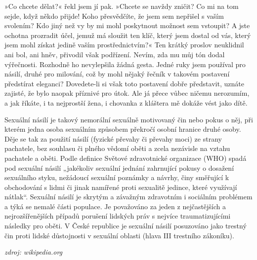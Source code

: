 \documentclass[13pt, a4paper, twoside]{article}
\begin{document}
»Co chcete dělat?« řekl jsem jí pak. »Chcete se navždy zničit? Co mi na tom sejde, když někdo přijde! Koho přesvědčíte, že jsem sem nepřišel s vaším svolením? Kdo jiný než vy by mi mohl poskytnout možnost sem vstoupit? A jste ochotna prozradit účel, jemuž má sloužit ten klíč, který jsem dostal od vás, který jsem mohl získat jedině vaším prostřednictvím?« Ten krátký proslov neuklidnil ani bol, ani hněv, přivodil však podřízení. Nevím, zda mu můj tón dodal výřečnosti. Rozhodně ho nevylepšila žádná gesta. Jedné ruky jsem používal pro násilí, druhé pro milování, což by mohl nějaký řečník v takovém postavení předstírat eleganci? Dovedete-li si však toto postavení dobře představit, uznáte zajisté, že bylo naopak příznivé pro útok. Ale já přece vůbec ničemu nerozumím, a jak říkáte, i ta nejprostší žena, i chovanka z kláštera mě dokáže vést jako dítě.

\noindent\makebox[\linewidth]{\rule{\paperwidth}{0.4pt}}

Sexuální násilí je takový nemorální sexuálně motivovaný čin nebo pokus o něj, při kterém jedna osoba sexuálním způsobem překročí osobní hranice druhé osoby. Děje se tak za použití násilí (fyzické převahy či převahy moci) ze strany pachatele, bez souhlasu či plného vědomí oběti a zcela nezávisle na vztahu pachatele a oběti. Podle definice Světové zdravotnické organizace (WHO) spadá pod sexuální násilí „jakékoliv sexuální jednání zahrnující pokusy o dosažení sexuálního styku, nežádoucí sexuální poznámky a návrhy, činy směřující k obchodování s lidmi či jinak namířené proti sexualitě jedince, které využívají nátlak“.
Sexuální násilí je skrytým a závažným zdravotním i sociálním problémem a týká se nemalé části populace. Je považováno za jeden z nejčastějších a nejrozšířenějších případů porušení lidských práv s nejvíce traumatizujícími následky pro oběti. V České republice je sexuální násilí posuzováno jako trestný čin proti lidské důstojnosti v sexuální oblasti (hlava III trestního zákoníku).

\hspace*{\fill} \emph{zdroj: wikipedia.org}
\end{document}
